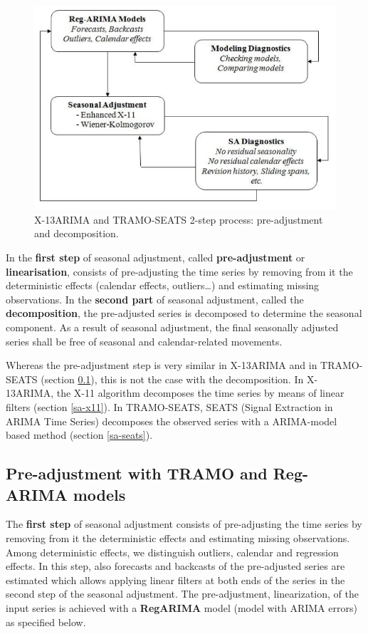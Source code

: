 \documentclass[article]{jss}
\begin{document}
\begin{figure}[htb]
\centering
\includegraphics[scale=0.8]{img/sa_2_steps.PNG} 
\caption{X-13ARIMA and TRAMO-SEATS 2-step process: pre-adjustment and decomposition.}
\label{fig:2_step_proc}
\end{figure}

In the \textbf{first step} of seasonal adjustment, called
\textbf{pre-adjustment} or \textbf{linearisation}, consists of
pre-adjusting the time series by removing from it the deterministic
effects (calendar effects, outliers\ldots{}) and estimating missing
observations. In the \textbf{second part} of seasonal adjustment, called
the \textbf{decomposition}, the pre-adjusted series is decomposed to
determine the seasonal component. As a result of seasonal adjustment,
the final seasonally adjusted series shall be free of seasonal and
calendar-related movements.

Whereas the pre-adjustment step is very similar in X-13ARIMA and in
TRAMO-SEATS (section \ref{pre-adjustment}), this is not the case with
the decomposition. In X-13ARIMA, the X-11 algorithm decomposes the time
series by means of linear filters (section \ref{sa-x11}). In
TRAMO-SEATS, SEATS (Signal Extraction in ARIMA Time Series) decomposes
the observed series with a ARIMA-model based method (section
\ref{sa-seats}).

\hypertarget{pre-adjustment}{%
\subsection{Pre-adjustment with TRAMO and Reg-ARIMA
models}\label{pre-adjustment}}

The \textbf{first step} of seasonal adjustment consists of pre-adjusting
the time series by removing from it the deterministic effects and
estimating missing observations. Among deterministic effects, we
distinguish outliers, calendar and regression effects. In this step,
also forecasts and backcasts of the pre-adjusted series are estimated
which allows applying linear filters at both ends of the series in the
second step of the seasonal adjustment. The pre-adjustment,
linearization, of the input series is achieved with a \textbf{RegARIMA}
model (model with ARIMA errors) as specified below.
\end{document}
